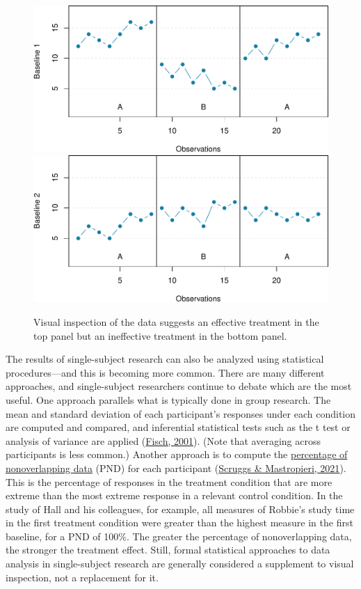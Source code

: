 \documentclass[
]{krantz}
\begin{document}
\begin{figure}

{\centering \includegraphics[width=0.6\linewidth]{10-single-N_files/figure-latex/aba2-1} \includegraphics[width=0.6\linewidth]{10-single-N_files/figure-latex/aba2-2} 

}

\caption{Visual inspection of the data suggests an effective treatment in the top panel but an ineffective treatment in the bottom panel.}\label{fig:aba2}
\end{figure}

The results of single-subject research can also be analyzed using statistical procedures---and this is becoming more common. There are many different approaches, and single-subject researchers continue to debate which are the most useful. One approach parallels what is typically done in group research. The mean and standard deviation of each participant's responses under each condition are computed and compared, and inferential statistical tests such as the t test or analysis of variance are applied (\protect\hyperlink{ref-fisch2001evaluating}{Fisch, 2001}). (Note that averaging across participants is less common.) Another approach is to compute the \protect\hyperlink{percentage-of-nonoverlapping-data}{percentage of nonoverlapping data} (PND) for each participant (\protect\hyperlink{ref-scruggs2021summarize}{Scruggs \& Mastropieri, 2021}). This is the percentage of responses in the treatment condition that are more extreme than the most extreme response in a relevant control condition. In the study of Hall and his colleagues, for example, all measures of Robbie's study time in the first treatment condition were greater than the highest measure in the first baseline, for a PND of 100\%. The greater the percentage of nonoverlapping data, the stronger the treatment effect. Still, formal statistical approaches to data analysis in single-subject research are generally considered a supplement to visual inspection, not a replacement for it.
\end{document}
